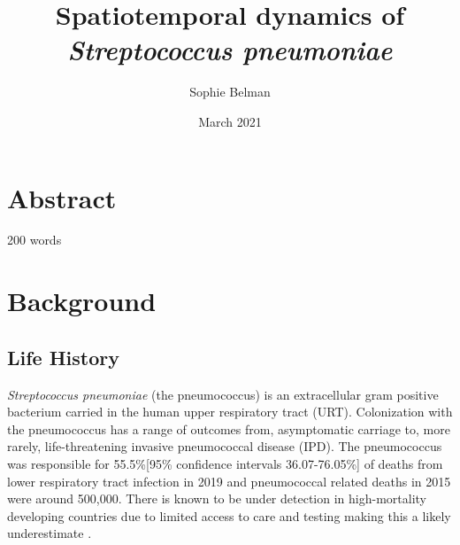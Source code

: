 \documentclass{article}
\title{Spatiotemporal dynamics of \textit{Streptococcus pneumoniae}}
\author{Sophie Belman}
\date{March 2021}
\begin{document}
\maketitle

\section{Abstract}

200 words

\section{Background}
\subsection{Life History}
\textit{Streptococcus pneumoniae} (the pneumococcus) is an extracellular gram positive bacterium carried in the human upper respiratory tract (URT). Colonization with the pneumococcus has a range of outcomes from, asymptomatic carriage to, more rarely, life-threatening invasive pneumococcal disease (IPD)\cite{weiserStreptococcusPneumoniaeTransmission2018}. The pneumococcus was responsible for 55.5\%[95\% confidence intervals 36.07-76.05\%] of deaths from lower respiratory tract infection in 2019 and pneumococcal related deaths in 2015 were around 500,000\cite{wahlBurdenStreptococcusPneumoniae2018,murrayFiveInsightsGlobal2020}. There is known to be under detection in high-mortality developing countries due to limited access to care and testing making this a likely underestimate \cite{obrienBurdenDiseaseCaused2009,troegerEstimatesGlobalRegional2017}. 
\end{document}
